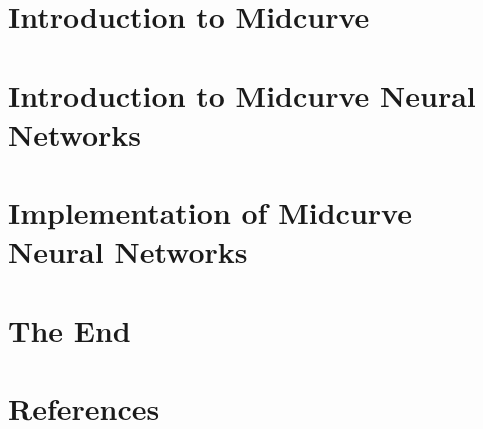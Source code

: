 \section[Intro]{Introduction to Midcurve}


\section[NN]{Introduction to Midcurve Neural Networks}


\section[NNIMPL]{Implementation of Midcurve Neural Networks}


\section[End]{The End}


\section[Refs]{References}


